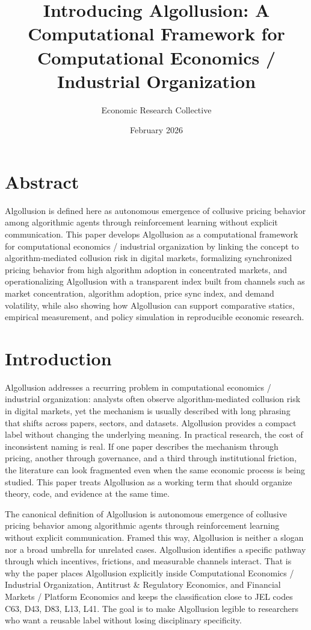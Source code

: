 \documentclass[12pt]{article}
\title{Introducing Algollusion: A Computational Framework for Computational Economics / Industrial Organization}
\author{Economic Research Collective}
\date{February 2026}
\begin{document}
\maketitle

\section*{Abstract}
Algollusion is defined here as autonomous emergence of collusive pricing behavior among algorithmic agents through reinforcement learning without explicit communication. This paper develops Algollusion as a computational framework for computational economics / industrial organization by linking the concept to algorithm-mediated collusion risk in digital markets, formalizing synchronized pricing behavior from high algorithm adoption in concentrated markets, and operationalizing Algollusion with a transparent index built from channels such as market concentration, algorithm adoption, price sync index, and demand volatility, while also showing how Algollusion can support comparative statics, empirical measurement, and policy simulation in reproducible economic research.

\section{Introduction}
Algollusion addresses a recurring problem in computational economics / industrial organization: analysts often observe algorithm-mediated collusion risk in digital markets, yet the mechanism is usually described with long phrasing that shifts across papers, sectors, and datasets. Algollusion provides a compact label without changing the underlying meaning. In practical research, the cost of inconsistent naming is real. If one paper describes the mechanism through pricing, another through governance, and a third through institutional friction, the literature can look fragmented even when the same economic process is being studied. This paper treats Algollusion as a working term that should organize theory, code, and evidence at the same time.

The canonical definition of Algollusion is autonomous emergence of collusive pricing behavior among algorithmic agents through reinforcement learning without explicit communication. Framed this way, Algollusion is neither a slogan nor a broad umbrella for unrelated cases. Algollusion identifies a specific pathway through which incentives, frictions, and measurable channels interact. That is why the paper places Algollusion explicitly inside Computational Economics / Industrial Organization, Antitrust \& Regulatory Economics, and Financial Markets / Platform Economics and keeps the classification close to JEL codes C63, D43, D83, L13, L41. The goal is to make Algollusion legible to researchers who want a reusable label without losing disciplinary specificity.
\end{document}
